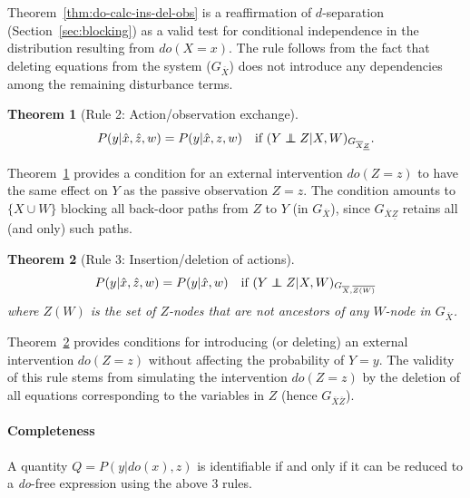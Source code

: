 \documentclass[11pt]{article}
\numberwithin{equation}{section}
\newcommand\indep{\protect\mathpalette{\protect\independenT}{\perp}}
\def\independenT#1#2{\mathrel{\rlap{$#1#2$}\mkern2mu{#1#2}}}
\newtheorem{thm}{Theorem}[section]
\begin{document}
Theorem~\ref{thm:do-calc-ins-del-obs} is a reaffirmation of $d$-separation (Section~\ref{sec:blocking}) as a valid test for conditional independence in the distribution resulting from $do(X=x)$. The rule follows from the fact that deleting equations from the system ($G_{{\overline{X}}}$) does not introduce any dependencies among the remaining disturbance terms.

\begin{thm}[Rule 2: Action/observation exchange]
\begin{equation}
P(y|\hat{x},\hat{z},w) = P(y|\hat{x},z,w) \quad \text{if}\ (Y \indep Z|X,W)_{G_{{\overline{X}\underline{Z}}}}.
\end{equation}  \label{thm:do-calc-act-obs-ex}
\end{thm}

Theorem~\ref{thm:do-calc-act-obs-ex} provides a condition for an external intervention $do(Z=z)$ to have the same effect on $Y$ as the passive observation $Z=z$. The condition amounts to $\{X \cup W\}$ blocking all back-door paths from $Z$ to $Y$ (in $G_{\overline{X}}$), since $G_{\overline{X}\underline{Z}}$ retains all (and only) such paths.

\begin{thm}[Rule 3: Insertion/deletion of actions] 
\begin{equation}
P(y|\hat{x},\hat{z},w) = P(y|\hat{x},w) \quad \text{if}\ (Y \indep Z|X,W)_{G_{{\overline{X},\overline{Z(W)}}}}
\end{equation}  \label{thm:do-calc-ins-del-act}
where $Z(W)$ is the set of $Z$-nodes that are not ancestors of any $W$-node in $G_{\overline{X}}$.
\end{thm}

Theorem~\ref{thm:do-calc-ins-del-act} provides conditions for introducing (or deleting) an external intervention $do(Z=z)$ without affecting the probability of $Y=y$. The validity of this rule stems from simulating the intervention $do(Z=z)$ by the deletion of all equations corresponding to the variables in $Z$ (hence $G_{\overline{X} \overline{Z}}$).

\paragraph{Completeness} A quantity $Q=P(y|do(x),z)$ is identifiable if and only if it can be reduced to a \textit{do}-free expression using the above 3 rules.
\end{document}
